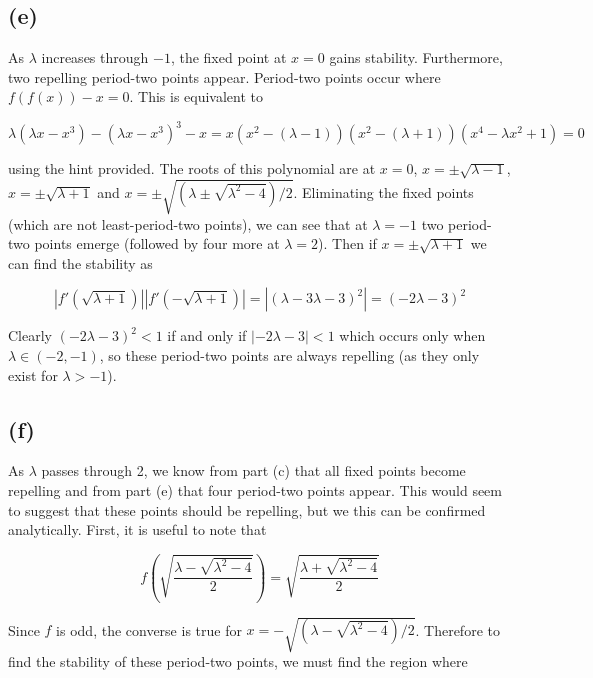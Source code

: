 \documentclass{article}
\begin{document}
\subsection*{(e)}
As $\lambda$ increases through $-1$, the fixed point at $x = 0$ gains stability. Furthermore, two 
repelling period-two points appear. Period-two points occur where $f(f(x)) -x = 0$. This is 
equivalent to 

\begin{equation*}
    \lambda(\lambda x - x^3) - (\lambda x - x^3)^3 -x = x(x^2 - (\lambda -1))(x^2 - (\lambda + 1))(x^4 - \lambda x^2 +1) = 0
\end{equation*}

using the hint provided. The roots of this polynomial are at $x = 0$, $x = \pm\sqrt{\lambda -1}$, 
$x = \pm \sqrt{\lambda +1}$ and $x = \pm \sqrt{(\lambda \pm \sqrt{\lambda^2-4})/2}$. Eliminating 
the fixed points (which are not least-period-two points), we can see that at $\lambda = -1$ two 
period-two points emerge (followed by four more at $\lambda = 2$). Then if $x = \pm \sqrt{\lambda +1}$ 
we can find the stability as 

\begin{equation*}
    |f'(\sqrt{\lambda +1})||f'(-\sqrt{\lambda +1})| = |(\lambda - 3\lambda -3)^2| = (-2\lambda -3)^2
\end{equation*}

Clearly $(-2\lambda -3)^2 < 1$ if and only if $|-2\lambda - 3| < 1$ which occurs only when 
$\lambda \in (-2,-1)$, so these period-two points are always repelling (as they only exist for $\lambda > -1$). 

\subsection*{(f)}
As $\lambda$ passes through 2, we know from part (c) that all fixed points become repelling and 
from part (e) that four period-two points appear. This would seem to suggest that these points 
should be repelling, but we this can be confirmed analytically. First, it is useful to note 
that 

\begin{equation}
    f\left(\sqrt{\frac{\lambda - \sqrt{\lambda^2 - 4}}{2}}\right) = \sqrt{\frac{\lambda + \sqrt{\lambda^2 -4}}{2}}
\end{equation}

Since $f$ is odd, the converse is true for $x = -\sqrt{(\lambda -\sqrt{\lambda^2 -4})/2}$. Therefore to 
find the stability of these period-two points, we must find the region where
\end{document}
